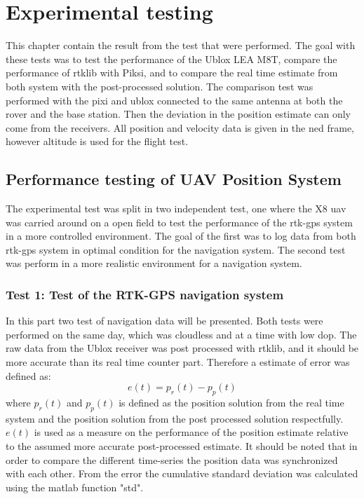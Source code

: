 
\chapter{Experimental testing}
This chapter contain the result from the test that were performed. The goal with these tests was to test the performance of the Ublox LEA M8T, compare the performance of \acrfull{rtklib} with Piksi, and to compare the real time estimate from both system with the post-processed solution. The comparison test was performed with the pixi and ublox connected to the same antenna at both the rover and the base station. Then the deviation in the position estimate can only come from the receivers. All position and velocity data is given in the \gls{ned} frame, however altitude is used for the flight test.
\section{Performance testing of UAV Position System}
The experimental test was split in two independent test, one where the X8 \gls{uav} was carried around on a open field to test the performance of the \gls{rtk-gps} system in a more controlled environment. The goal of the first was to log data from both \gls{rtk-gps} system in optimal condition for the navigation system. The second test was perform in a more realistic environment for a navigation system. 


\subsection{Test 1: Test of the RTK-GPS navigation system}
In this part two test of navigation data will be presented. Both tests were performed on the same day, which was cloudless and at a time with low \gls{dop}. The raw data from the Ublox receiver was post processed with rtklib, and it should be more accurate than its real time counter part. Therefore a estimate of error was defined as:
\begin{equation}
e(t) = p_r(t) - p_p(t)
\end{equation}
where $p_r(t)$ and $p_p(t)$ is defined as the position solution from the real time system and the position solution from the post processed solution respectfully. $e(t)$ is used as a measure on the performance of the position estimate relative to the assumed more accurate post-processed estimate. It should be noted that in order to compare the different time-series the position data was synchronized with each other. From the error the cumulative standard deviation was calculated using the matlab function "std".
